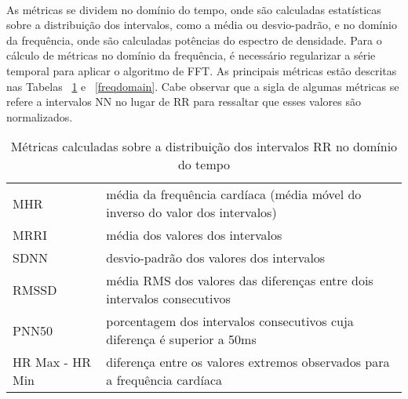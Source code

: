             \paragraph{} As métricas se dividem no domínio do tempo, onde são calculadas estatísticas sobre a distribuição dos intervalos, como a média ou desvio-padrão, e no domínio da frequência, onde são calculadas potências do espectro de densidade. Para o cálculo de métricas no domínio da frequência, é necessário regularizar a série temporal para aplicar o algoritmo de FFT. As principais métricas estão descritas nas Tabelas ~\ref{timedomain} e ~\ref{freqdomain}.  Cabe observar que a sigla de algumas métricas se refere a intervalos NN no lugar de RR para ressaltar que esses valores são normalizados.

            \begin{table}[ht!]
                \centering
                \caption{Métricas calculadas sobre a  distribuição dos intervalos RR no domínio do tempo}
                \label{timedomain}
                \begin{tabular}{l | p{8cm}}
                MHR & média da frequência cardíaca (média móvel do inverso do valor dos intervalos) \\
                MRRI  & média dos valores dos intervalos                             \\
                SDNN  & desvio-padrão dos valores dos intervalos                     \\
                RMSSD & média RMS dos valores das diferenças entre dois intervalos consecutivos  \\
                PNN50 & porcentagem dos intervalos consecutivos cuja diferença é
                superior a 50ms \\
                HR Max - HR Min & diferença entre os valores extremos observados para a frequência cardíaca \\
                \end{tabular}
            \end{table}

